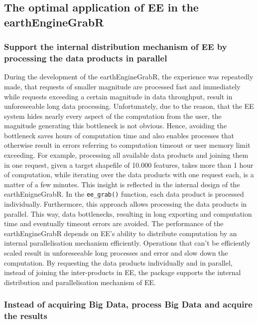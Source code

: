 \subsection{The optimal application of EE in the earthEngineGrabR}

\subsubsection{Support the internal distribution mechanism of EE by processing the data products in parallel}

During the development of the earthEngineGrabR, the experience was repeatedly made, that requests of smaller magnitude are processed fast and immediately while requests exceeding a certain magnitude in data throughput, result in unforeseeable long data processing. Unfortunately, due to the reason, that the EE system hides nearly every aspect of the computation from the user, the magnitude generating this bottleneck is not obvious. Hence, avoiding the bottleneck saves hours of computation time and also enables processes that otherwise result in errors referring to computation timeout or user memory limit exceeding. For example, processing all available data products and joining them in one request, given a target shapefile of 10.000 features, takes more than 1 hour of computation, while iterating over the data products with one request each, is a matter of a few minutes. This insight is reflected in the internal design of the earthEnigneGrabR. In the \texttt{ee\_grab()} function, each data product is processed individually. Furthermore, this approach allows processing the data products in parallel. This way, data bottlenecks, resulting in long exporting and computation time and eventually timeout errors are avoided. The performance of the earthEngineGrabR depends on EE's ability to distribute computation by an internal parallelisation mechanism efficiently. Operations that can't be efficiently scaled result in unforeseeable long processes and error and slow down the computation. By requesting the data products individually and in parallel, instead of joining the inter-products in EE, the package supports the internal distribution and parallelisation mechanism of EE.

\subsubsection{Instead of acquiring Big Data, process Big Data and acquire the results}

